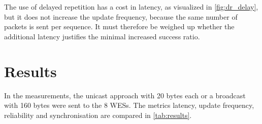The use of delayed repetition has a cost in latency, as visualized in \cref{fig:dr_delay},
but it does not increase the update frequency, because the same number of packets is sent per sequence.
It must therefore be weighed up whether the additional latency justifies the minimal increased success ratio.





\section{Results}

In the measurements, the unicast approach with 20 bytes each or a broadcast with 160 bytes were sent to the 8 WESs.
The metrics latency, update frequency, reliability and synchronisation are compared in \cref{tab:results}.

